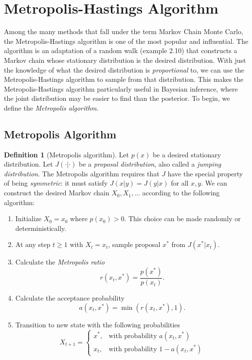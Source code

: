 \documentclass[11pt]{amsart}
\theoremstyle{theorem} %
\theoremstyle{definition}                  %
\newtheorem{defn}[thm]{Definition}
\theoremstyle{example}                       %
\theoremstyle{remark}                       %
\numberwithin{equation}{section}
\begin{document}

\section{Metropolis-Hastings Algorithm}

Among the many methods that fall under the term Markov Chain Monte Carlo, the Metropolis-Hastings algorithm\cite{blitzstein}\cite{mcmc}\cite{gelman} is one of the most popular and influential. The algorithm is an adaptation of a random walk (example 2.10) that constructs a Markov chain whose stationary distribution is the desired distribution. With just the knowledge of what the desired distribution is \emph{proportional} to, we can use the Metropolis-Hastings algorithm to sample from that distribution. This makes the Metropolis-Hastings algorithm particularly useful in Bayesian inference, where the joint distribution may be easier to find than the posterior. To begin, we define the \emph{Metropolis algorithm}.

\subsection{Metropolis Algorithm}

\begin{defn}[{Metropolis algorithm}]
    Let $p(x)$ be a desired stationary distribution. Let $J(\cdot|\cdot)$ be a \emph{proposal distribution}, also called a \emph{jumping distribution}. The Metropolis algorithm requires that $J$ have the special property of being \emph{symmetric}: it must satisfy $J(x|y)=J(y|x)$ for all $x,y$. We can construct the desired Markov chain $X_0, X_1,...$ according to the following algorithm:


\begin{enumerate}
    \item Initialize $X_0=x_0$ where $p(x_0)>0$. This choice can be made randomly or deterministically. 
    \item At any step $t\geq 1$ with $X_t=x_t$, sample proposal $x^*$ from $J(x^*|x_t)$.
    \item Calculate the \emph{Metropolis ratio}
    \[r(x_t,x^*)=\frac{p(x^*)}{p(x_t)}.\]
    \item Calculate the acceptance probability
    \[a(x_t,x^*)=\min(r(x_t,x^*),1).\]
    \item Transition to new state with the following probabilities \[X_{t+1}=\begin{cases}x^*, & \text{with probability }a(x_t,x^*) \\
    x_t, & \text{with probability }1-a(x_t,x^*)
    \end{cases}\]
\end{enumerate}
\end{defn}
\end{document}
